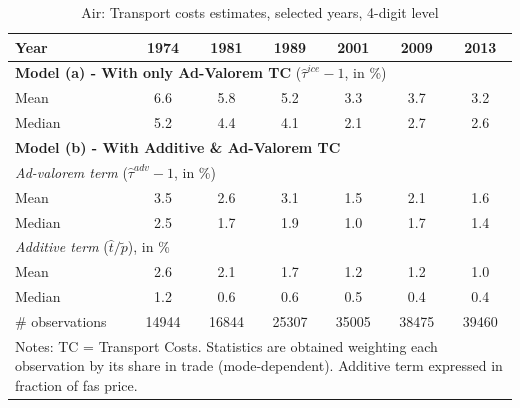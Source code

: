 \documentclass[a4paper,11pt]{article}
\begin{document}
\begin{table}[htbp]
  \centering
  \caption{Air: Transport costs estimates, selected years, 4-digit level}
\begin{center}
  \footnotesize{
    \begin{tabular}{l|cccccc}
   \hline\hline
Year & 1974  & 1981  & 1989  & 2001  & 2009  & 2013 \\ \hline
\multicolumn{7}{l}{\textbf{Model (a) - With only Ad-Valorem TC} ($\widehat{\tau}^{ice}-1$, in \%) }  \\
\hline
Mean  & 6.6 & 5.8 & 5.2 & 3.3 & 3.7 & 3.2 \\
Median & 5.2 & 4.4 & 4.1 & 2.1 & 2.7 & 2.6 \\
\hline
\multicolumn{7}{l}{\textbf{Model (b) - With Additive \& Ad-Valorem TC}}  \\ \hline
\multicolumn{7}{l}{\textit{Ad-valorem term }($\widehat{\tau}^{adv}-1$, in \%) }   \\ \hline
Mean  & 3.5 & 2.6 & 3.1 & 1.5 & 2.1 & 1.6  \\
Median & 2.5 & 1.7 & 1.9 & 1.0 & 1.7 & 1.4  \\
\hline
\multicolumn{7}{l}{\textit{Additive term} ($\widehat{t}/\widetilde{p}$), in \%}    \\ \hline
Mean  & 2.6 & 2.1 & 1.7 & 1.2 &1.2 & 1.0 \\
Median & 1.2 & 0.6 & 0.6 & 0.5 & 0.4 & 0.4  \\
\hline
\# observations & 14944 & 16844 & 25307 & \multicolumn{1}{c}{35005} & \multicolumn{1}{c}{38475} & \multicolumn{1}{c}{39460}  \\
\hline\hline
\multicolumn{7}{l}{\parbox[l]{11cm}{ \vspace{7pt}\scriptsize{Notes: TC = Transport Costs.
Statistics are obtained weighting each observation by its share in trade (mode-dependent).
Additive term expressed in fraction of fas price.}}}
\end{tabular}%
}
\end{center}
  \label{tab:result_air_rob}
\end{table}%
\end{document}
